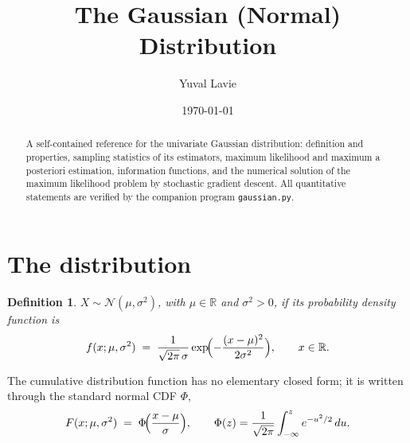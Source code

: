 \documentclass[11pt]{article}
\title{The Gaussian (Normal) Distribution}
\author{Yuval Lavie}
\date{\today}
\newtheorem{definition}{Definition}
\theoremstyle{remark}
\begin{document}
\maketitle

\begin{abstract}
A self-contained reference for the univariate Gaussian distribution:
definition and properties, sampling statistics of its estimators,
maximum likelihood and maximum a posteriori estimation, information
functions, and the numerical solution of the maximum likelihood
problem by stochastic gradient descent. All quantitative statements
are verified by the companion program \texttt{gaussian.py}.
\end{abstract}

\section{The distribution}

\begin{definition}
$X \sim \mathcal{N}(\mu, \sigma^2)$, with $\mu \in \mathbb{R}$ and
$\sigma^2 > 0$, if its probability density function is
\begin{equation}
  f(x; \mu, \sigma^2)
  \;=\; \frac{1}{\sqrt{2\pi}\,\sigma}
  \exp\!\Bigl(-\frac{(x-\mu)^2}{2\sigma^2}\Bigr),
  \qquad x \in \mathbb{R}.
  \label{eq:pdf}
\end{equation}
\end{definition}

The cumulative distribution function has no elementary closed form;
it is written through the standard normal CDF $\Phi$,
\begin{equation}
  F(x; \mu, \sigma^2) \;=\; \Phi\!\Bigl(\frac{x - \mu}{\sigma}\Bigr),
  \qquad
  \Phi(z) = \frac{1}{\sqrt{2\pi}} \int_{-\infty}^{z} e^{-u^2/2}\,du.
  \label{eq:cdf}
\end{equation}

\begin{center}
\end{center}
\end{document}
